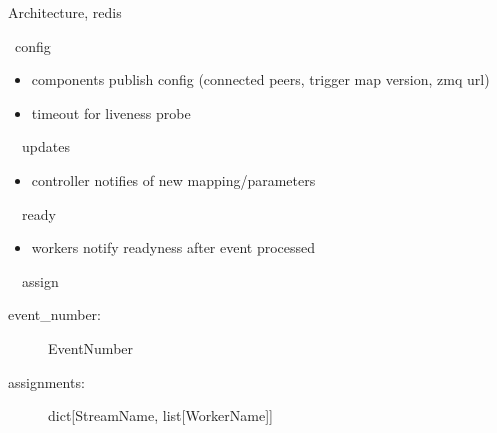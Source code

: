 \documentclass[aspectratio=169]{beamer}
\begin{document}
\begin{frame}{Architecture, redis}
 \begin{block}{\faDatabase\ config}
  \begin{itemize}
   \item components publish config (connected peers, trigger map version, zmq url)
   \item timeout for liveness probe
  \end{itemize}
 \end{block}
 
 \begin{block}{\faDatabase\ \faForward\ updates}
  \begin{itemize}
   \item controller notifies of new mapping/parameters
  \end{itemize}
 \end{block}
 
 \begin{block}{\faDatabase\ \faForward\ ready}
  \begin{itemize}
   \item workers notify readyness after event processed
  \end{itemize}
 \end{block}
 
 \begin{block}{\faDatabase\ \faForward\ assign}
  \begin{description}
   \item[event\_number:] EventNumber
   \item[assignments:] dict[StreamName, list[WorkerName]]
  \end{description}

 \end{block}

\end{frame}
\end{document}
